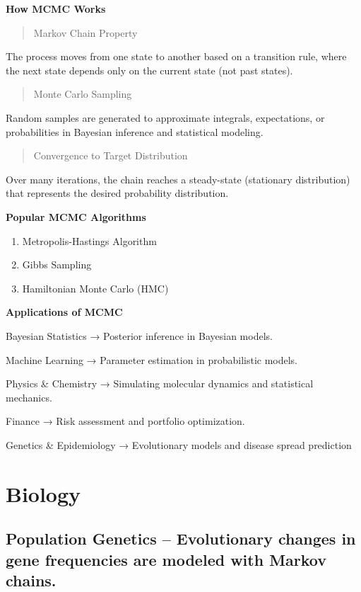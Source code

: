 \documentclass[
  letterpaper,
  DIV=11,
  numbers=noendperiod]{scrreprt}
\begin{document}
\textbf{How MCMC Works}

\begin{quote}
Markov Chain Property
\end{quote}

The process moves from one state to another based on a transition rule,
where the next state depends only on the current state (not past
states).

\begin{quote}
Monte Carlo Sampling
\end{quote}

Random samples are generated to approximate integrals, expectations, or
probabilities in Bayesian inference and statistical modeling.

\begin{quote}
Convergence to Target Distribution
\end{quote}

Over many iterations, the chain reaches a steady-state (stationary
distribution) that represents the desired probability distribution.

\textbf{Popular MCMC Algorithms}

\begin{enumerate}
\def\labelenumi{\arabic{enumi}.}
\item
  Metropolis-Hastings Algorithm
\item
  Gibbs Sampling
\item
  Hamiltonian Monte Carlo (HMC)
\end{enumerate}

\textbf{Applications of MCMC}

Bayesian Statistics → Posterior inference in Bayesian models.

Machine Learning → Parameter estimation in probabilistic models.

Physics \& Chemistry → Simulating molecular dynamics and statistical
mechanics.

Finance → Risk assessment and portfolio optimization.

Genetics \& Epidemiology → Evolutionary models and disease spread
prediction

\section{Biology}\label{biology}

\subsection{Population Genetics -- Evolutionary changes in gene
frequencies are modeled with Markov
chains.}\label{population-genetics-evolutionary-changes-in-gene-frequencies-are-modeled-with-markov-chains.}
\end{document}
